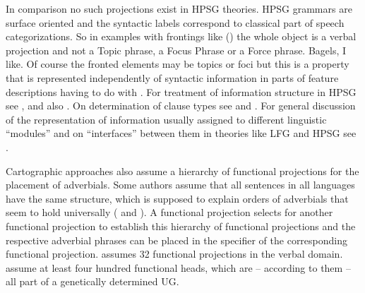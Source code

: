 \documentclass[output=paper]{langsci/langscibook}
\begin{document}
In comparison no such projections exist in HPSG theories. HPSG grammars are surface oriented and the
syntactic labels correspond to classical part of speech categorizations. So in examples with
frontings like () the whole object is a verbal projection and not a Topic phrase, a Focus
Phrase or a Force phrase.
\ea
Bagels, I like.
\z
Of course the fronted elements may be topics or foci but this is a property that is represented
independently of syntactic information in parts of feature descriptions having to do with
. For treatment of information structure in HPSG see
,  and also . On determination of clause types see
 and . For general discussion of the representation of
information usually assigned to different linguistic ``modules'' and on ``interfaces''
between them in theories like LFG and HPSG see .

Cartographic approaches also assume a hierarchy of functional projections for the placement of
adverbials. Some authors assume that all sentences in all languages have the same structure, which is supposed
to explain orders of adverbials that seem to hold universally (\eg \citealp[]{Cinque99a-u}
and \citealp[--55]{CR2010a}). A functional projection selects for another functional
projection to establish this hierarchy of functional projections and the respective adverbial
phrases can be placed in the specifier of the corresponding functional projection. \citet[]{Cinque99a-u} assumes 32 functional projections in the verbal domain. \citet[, 65]{CR2010a} assume at least four hundred functional heads, which are -- according to them -- all
part of a genetically determined UG.
\end{document}
